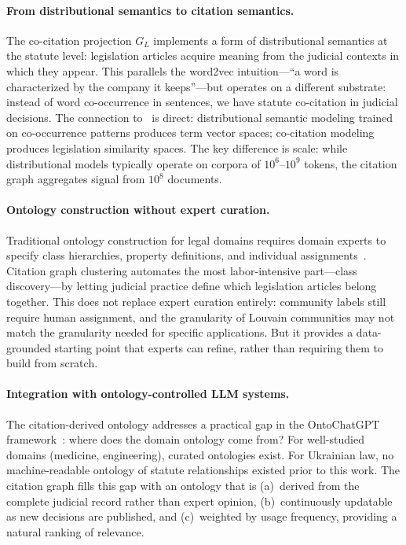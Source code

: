 \documentclass[11pt]{article}
\begin{document}
\paragraph{From distributional semantics to citation semantics.}
The co-citation projection $G_L$ implements a form of distributional semantics at the statute level: legislation articles acquire meaning from the judicial contexts in which they appear.
This parallels the word2vec intuition---``a word is characterized by the company it keeps''---but operates on a different substrate: instead of word co-occurrence in sentences, we have statute co-citation in judicial decisions.
The connection to~\citet{palagin2020distributional} is direct: distributional semantic modeling trained on co-occurrence patterns produces term vector spaces; co-citation modeling produces legislation similarity spaces.
The key difference is scale: while distributional models typically operate on corpora of $10^6$--$10^9$ tokens, the citation graph aggregates signal from $10^8$ documents.

\paragraph{Ontology construction without expert curation.}
Traditional ontology construction for legal domains requires domain experts to specify class hierarchies, property definitions, and individual assignments~\citep{gruber1993ontology}.
Citation graph clustering automates the most labor-intensive part---class discovery---by letting judicial practice define which legislation articles belong together.
This does not replace expert curation entirely: community labels still require human assignment, and the granularity of Louvain communities may not match the granularity needed for specific applications.
But it provides a data-grounded starting point that experts can refine, rather than requiring them to build from scratch.

\paragraph{Integration with ontology-controlled LLM systems.}
The citation-derived ontology addresses a practical gap in the OntoChatGPT framework~\citep{palagin2023ontochatgpt}: where does the domain ontology come from?
For well-studied domains (medicine, engineering), curated ontologies exist.
For Ukrainian law, no machine-readable ontology of statute relationships existed prior to this work.
The citation graph fills this gap with an ontology that is (a)~derived from the complete judicial record rather than expert opinion, (b)~continuously updatable as new decisions are published, and (c)~weighted by usage frequency, providing a natural ranking of relevance.
\end{document}
